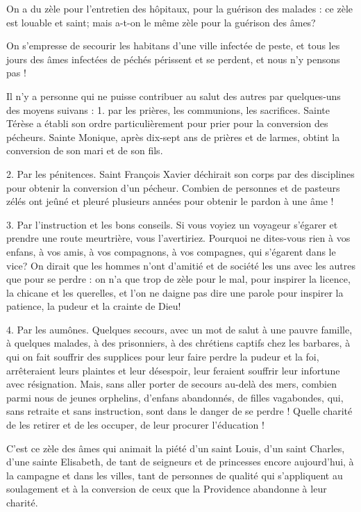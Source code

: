 \documentclass[instructions.tex]{subfiles}
\begin{document}
On a du zèle pour l’entretien des hôpitaux, pour la guérison des malades : ce zèle est louable et saint; mais a-t-on le même zèle pour la guérison des âmes?
 
On s’empresse de secourir les habitans d’une ville infectée de peste, et tous les jours des âmes infectées de péchés périssent et se perdent, et nous n’y pensons pas !
 
Il n’y a personne qui ne puisse contribuer au salut des autres par quelques-uns des moyens suivans : 1. par les prières, les communions, les sacrifices. Sainte Térèse a établi son ordre particulièrement pour prier pour la conversion des pécheurs. Sainte Monique, après dix-sept ans de prières et de larmes, obtint la conversion de son mari et de son fils.
 
2. Par les pénitences. Saint François Xavier déchirait son corps par des disciplines pour obtenir la conversion d’un pécheur. Combien de personnes et de pasteurs zélés ont jeûné et pleuré plusieurs années pour obtenir le pardon à une âme !
 
3. Par l’instruction et les bons conseils. Si vous voyiez un voyageur s’égarer et prendre une route meurtrière, vous l’avertiriez. Pourquoi ne dites-vous rien à vos enfans, à vos amis, à vos compagnons, à vos compagnes, qui s’égarent dans le vice? On dirait que les hommes n’ont d’amitié et de société les uns avec les autres que pour se perdre : on n’a que trop de zèle pour le mal, pour inspirer la licence, la chicane et les querelles, et l’on ne daigne pas dire une parole pour inspirer la patience, la pudeur et la crainte de Dieu!
 
4. Par les aumônes. Quelques secours, avec un mot de salut à une pauvre famille, à quelques malades, à des prisonniers, à des chrétiens captifs chez les barbares, à qui on fait souffrir des supplices pour leur faire perdre la pudeur et la foi, arrêteraient leurs plaintes et leur désespoir, leur feraient souffrir leur infortune avec résignation. Mais, sans aller porter de secours au-delà des mers, combien parmi nous de jeunes orphelins, d’enfans abandonnés, de filles vagabondes, qui, sans retraite et sans instruction, sont dans le danger de se perdre ! Quelle charité de les retirer et de les occuper, de leur procurer l’éducation !
 
\tertio C’est ce zèle des âmes qui animait la piété d’un saint Louis, d’un saint Charles, d’une sainte Elisabeth, de tant de seigneurs et de princesses encore aujourd’hui, à la campagne et dans les villes, tant de personnes de qualité qui s’appliquent au soulagement et à la conversion de ceux que la Providence abandonne à leur charité.
 
\end{document}
